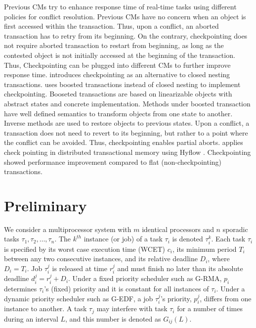 \documentclass[conference]{IEEEtran}
\begin{document}
Previous CMs try to enhance response time of real-time tasks using different policies for conflict resolution. Previous CMs have no concern when an object is first accessed within the transaction. Thus, upon a conflict, an aborted transaction has to retry from its beginning. On the contrary, checkpointing does not require aborted transaction to restart from beginning, as long as the contested object is not initially accessed at the beginning of the transaction. Thus, Checkpointing can be plugged into different CMs to further improve response time. \cite{Koskinen:2008:CCI:1378533.1378563} introduces checkpointing as an alternative to closed nesting transactions\cite{turcu2012closed}. \cite{Koskinen:2008:CCI:1378533.1378563} uses boosted transactions \cite{Herlihy:2008:TBM:1345206.1345237} instead of closed nesting \cite{Peri:2011:CCE:1946143.1946152,turcu2012closed,6267834} to implement checkpointing. Booseted transactions are based on linearizable objects with abstract states and concrete implementation. Methods under boosted transaction have well defined semantics to transform objects from one state to another. Inverse methods are used to restore objects to previous states. Upon a conflict, a transaction does not need to revert to its beginning, but rather to a point where the conflict can be avoided. Thus, checkpointing enables partial aborts. \cite{turcu_phd_proposal} applies check pointing in distributed transactional memory using Hyflow \cite{Saad:2011:HHP:1996130.1996167}. Checkpointing showed performance improvement compared to flat (non-checkpointing) transactions.
%
\section{Preliminary}

We consider a multiprocessor system with $m$ identical processors and $n$ sporadic tasks $\tau_1, \tau_2,\ldots, \tau_n$. The $k^{th}$ instance (or job) of a task $\tau_i$ is denoted $\tau_i^k$. Each task $\tau_i$ is specified by its worst case execution time (WCET) $c_i$, its minimum period $T_i$ between any two consecutive instances, and its relative deadline $D_i$, where $D_i=T_i$. Job $\tau_i^j$ is released at time $r_i^j$ and must finish no later than its absolute deadline $d_i^j=r_i^j+D_i$. Under a fixed priority scheduler such as G-RMA, $p_i$ determines $\tau_i$'s (fixed) priority and it is constant for all instances of $\tau_i$. Under a dynamic priority scheduler such as G-EDF, a job $\tau_i^j$'s priority, $p_i^j$, differs from one instance to another. 
A task $\tau_j$ may interfere with task $\tau_i$ for a number of times during an interval $L$, and this number is denoted as $G_{ij}(L)$. 
\end{document}
